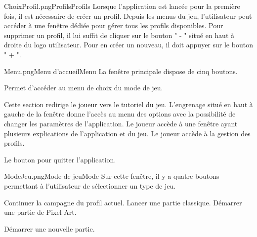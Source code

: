 \begin{maquette}{ChoixProfil.png}{Profils}{Profils}
    Lorsque l'application est lancée pour la première fois, il est nécessaire de créer un profil. Depuis les menus du jeu, l'utilisateur peut accéder à une fenêtre dédiée pour gérer tous les profils disponibles. Pour supprimer un profil, il lui suffit de cliquer sur le bouton " - " situé en haut à droite du logo utilisateur. Pour en créer un nouveau, il doit appuyer sur le bouton " + ".
\end{maquette}
\newpage
\begin{maquette}{Menu.png}{Menu d'accueil}{Menu}
        La fenêtre principale dispose de cinq boutons.
        \begin{description}
                Permet d'accéder au menu de choix du mode de jeu.
            \item[Tutoriel :]
                Cette section redirige le joueur vers le tutoriel du jeu.
                L'engrenage situé en haut à gauche de la fenêtre donne l'accès au menu des options avec la possibilité de changer les paramètres de l'application.
                Le joueur accède à une fenêtre ayant plusieurs explications de l'application et du jeu.
                Le joueur accède à la gestion des profils.
            \item[Quitter :]
                Le bouton pour quitter l'application.
        \end{description}
\end{maquette}

\begin{maquette}{ModeJeu.png}{Mode de jeu}{Mode}
    Sur cette fenêtre, il y a quatre boutons permettant à l'utilisateur de sélectionner un type de jeu.
    \begin{description}
            Continuer la campagne du profil actuel.
            Lancer une partie classique.
            Démarrer une partie de Pixel Art.
        \item[Mode SpeedRun :]
            Démarrer une nouvelle partie.
    \end{description}
\end{maquette}

